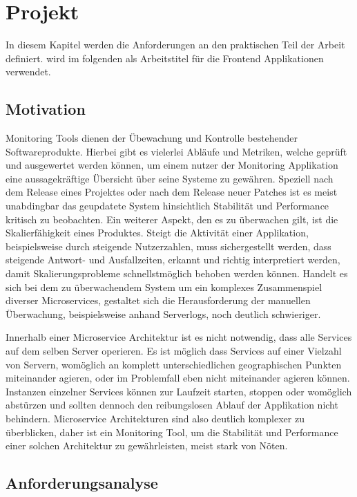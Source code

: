 
\chapter{Projekt \projectname}

In diesem Kapitel werden die Anforderungen an den praktischen Teil der Arbeit definiert.
\projectname wird im folgenden als Arbeitstitel für die Frontend Applikationen verwendet.

\section{Motivation}

Monitoring Tools dienen der Übewachung und Kontrolle bestehender Softwareprodukte.
Hierbei gibt es vielerlei Abläufe und Metriken, welche geprüft und ausgewertet werden können, um einem nutzer der Monitoring Applikation
eine aussagekräftige Übersicht über seine Systeme zu gewähren. Speziell nach dem Release eines Projektes oder nach dem Release neuer Patches
ist es meist unabdingbar das geupdatete System hinsichtlich Stabilität und Performance kritisch zu beobachten. Ein weiterer Aspekt, den es zu überwachen gilt,
ist die Skalierfähigkeit eines Produktes. Steigt die Aktivität einer Applikation, beispielsweise durch steigende Nutzerzahlen,
muss sichergestellt werden, dass steigende Antwort- und Ausfallzeiten, erkannt und richtig interpretiert werden, damit Skalierungsprobleme schnellstmöglich behoben werden können.
Handelt es sich bei dem zu überwachendem System um ein komplexes Zusammenspiel diverser Microservices, gestaltet sich die Herausforderung der manuellen Überwachung, beispielsweise anhand
Serverlogs, noch deutlich schwieriger.

Innerhalb einer Microservice Architektur ist es nicht notwendig, dass alle Services auf dem selben Server operieren.
Es ist möglich dass Services auf einer Vielzahl von Servern, womöglich an komplett unterschiedlichen geographischen Punkten miteinander agieren,
oder im Problemfall eben nicht miteinander agieren können. Instanzen einzelner Services können zur Laufzeit starten, stoppen oder womöglich abstürzen
und sollten dennoch den reibungslosen Ablauf der Applikation nicht behindern. Microservice Architekturen sind also deutlich komplexer zu überblicken,
daher ist ein Monitoring Tool, um die Stabilität und Performance einer solchen Architektur zu gewährleisten, meist stark von Nöten.


\section{Anforderungsanalyse}

